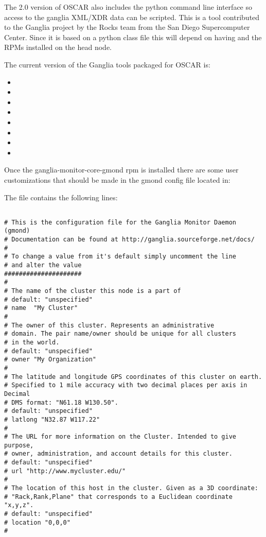 The 2.0 version of OSCAR also includes the  python
command line interface so access to the ganglia XML/XDR data can be
scripted. This is a tool contributed to the Ganglia project by the
Rocks team from the San Diego Supercomputer Center. Since it is based
on a python class file this will depend on having 
and the  RPMs installed on the head node.

The current version of the Ganglia tools packaged for OSCAR is:

\begin{itemize}
\item {}
\item {}
\item {}
\item {}
\item {}
\item {}
\item {}
\item {}
\end{itemize}

Once the ganglia-monitor-core-gmond rpm is installed there are some
user customizations that should be made in the gmond config file
located in:

\vspace{10pt}
\centerline{}
\vspace{10pt}

The file contains the following lines:

\begin{verbatim}

# This is the configuration file for the Ganglia Monitor Daemon (gmond)
# Documentation can be found at http://ganglia.sourceforge.net/docs/
#
# To change a value from it's default simply uncomment the line
# and alter the value
#####################
#
# The name of the cluster this node is a part of
# default: "unspecified"
# name  "My Cluster"
#
# The owner of this cluster. Represents an administrative
# domain. The pair name/owner should be unique for all clusters
# in the world.
# default: "unspecified"
# owner "My Organization"
#
# The latitude and longitude GPS coordinates of this cluster on earth.
# Specified to 1 mile accuracy with two decimal places per axis in Decimal
# DMS format: "N61.18 W130.50".
# default: "unspecified"
# latlong "N32.87 W117.22"
#
# The URL for more information on the Cluster. Intended to give purpose,
# owner, administration, and account details for this cluster.
# default: "unspecified"
# url "http://www.mycluster.edu/"
#
# The location of this host in the cluster. Given as a 3D coordinate:
# "Rack,Rank,Plane" that corresponds to a Euclidean coordinate "x,y,z".
# default: "unspecified"
# location "0,0,0"
#

\end{verbatim}

